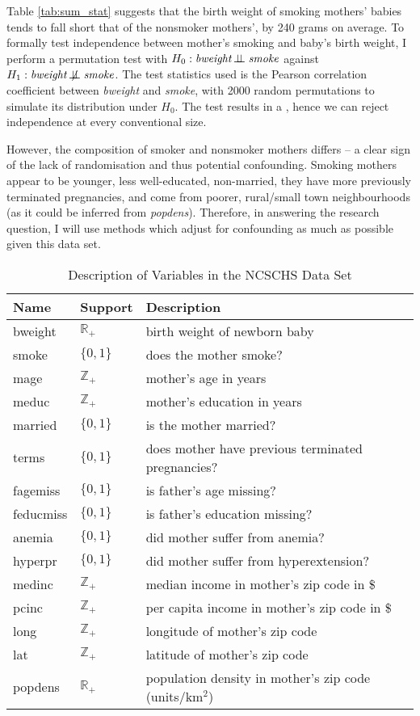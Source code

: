 \documentclass[a4paper,12pt]{article}
\newcommand{\indep}{\rotatebox[origin=c]{90}{$\models$}}
\renewcommand{\indep}{\!\perp\!\!\!\perp}
\newcommand{\notindep}{\not\!\perp\!\!\!\perp}
\newcommand{\posreal}{\mathbb{R}_+}
\newcommand{\posint}{\mathbb{Z}_+}
\newcommand{\dummy}{\{0,1\}}
\begin{document}
\noindent Table \ref{tab:sum_stat} suggests that the birth weight of smoking mothers' babies tends to fall short that of the nonsmoker mothers', by 240 grams on average. To formally test independence between mother's smoking and baby's birth weight, I perform a permutation test with $H_0: \text{\textit{bweight}}\indep\text{\textit{smoke}}$ against $H_1: \text{\textit{bweight}}\notindep\text{\textit{smoke}}$.  The test statistics used is the Pearson correlation coefficient  between \textit{bweight} and \textit{smoke}, with 2000  random permutations to simulate its distribution under $H_0$.
The test results in a ,
hence we can reject independence at every conventional size. 

\noindent However, the composition of smoker and nonsmoker mothers differs -- a clear sign of the lack of randomisation and thus potential confounding. Smoking mothers appear to be younger, less well-educated, non-married, they have more previously terminated pregnancies, and come from poorer, rural/small town neighbourhoods (as it could be inferred from \textit{popdens}). Therefore, in answering the research question, I will use methods which adjust for confounding as much as possible given this data set.


\begin{table}[h!]
\centering
\caption{Description of Variables in the NCSCHS Data Set}
\label{tab:data_des}
\begin{tabular}{lll}
Name & Support & Description \\ \hline\hline
bweight &  $\posreal$& birth weight of newborn baby \\
smoke & $\dummy$ &does the mother smoke? \\ \hline
mage & $\posint$ & mother's age in years \\
meduc & $\posint$ & mother's education in years \\
married &$\dummy$&is the mother married? \\
terms & $\dummy$ & does mother have previous terminated pregnancies? \\
fagemiss & $\dummy$ & is father's age missing? \\
feducmiss &$\dummy$& is father's education missing? \\
anemia & $\dummy$& did mother suffer from anemia? \\
hyperpr &$\dummy$& did mother suffer from hyperextension? \\
medinc &$\posint$& median income in mother's zip code in \$ \\
pcinc &$\posint$& per capita income in mother's zip code  in \$ \\
long & $\posint$& longitude of mother's zip code \\
lat &$\posint$& latitude of mother's zip code \\
popdens &$\posreal$& population density in mother's  zip code (units/km$^2$)\\ \hline
\end{tabular}
\end{table}
\end{document}

